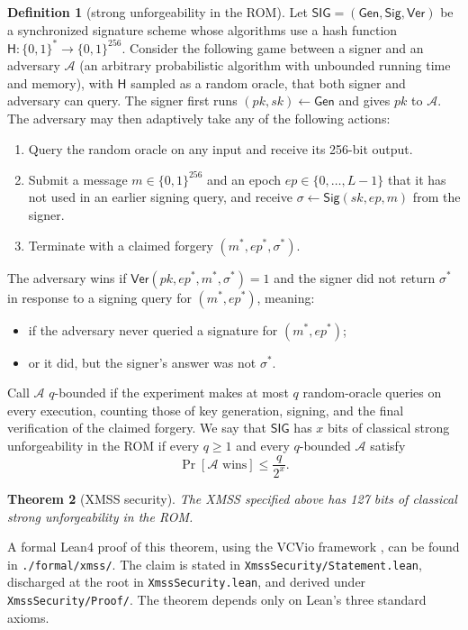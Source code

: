 \documentclass[11pt]{article}
\theoremstyle{definition}
\newtheorem{definition}{Definition}[section]
\theoremstyle{plain}
\newtheorem{theorem}[definition]{Theorem}
\theoremstyle{remark}
\newcommand{\bits}[1]{\{0,1\}^{#1}}
\newcommand{\Gen}{\mathsf{Gen}}
\newcommand{\Sig}{\mathsf{Sig}}
\newcommand{\Ver}{\mathsf{Ver}}
\newcommand{\SIG}{\mathsf{SIG}}
\newcommand{\hash}{\mathsf{H}}
\newcommand{\ep}{\mathit{ep}}
\newcommand{\sk}{\mathit{sk}}
\newcommand{\pk}{\mathit{pk}}
\begin{document}
\begin{definition}[strong unforgeability in the ROM]
Let $\SIG=(\Gen,\Sig,\Ver)$ be a synchronized signature scheme whose algorithms use a hash function $\hash:\bits{*}\to\bits{256}$. Consider the following game between a signer and an adversary $\mathcal A$ (an arbitrary probabilistic algorithm with unbounded running time and memory), with $\hash$ sampled as a random oracle, that both signer and adversary can query. The signer first runs $(\pk,\sk)\gets\Gen$ and gives $\pk$ to $\mathcal A$. The adversary may then adaptively take any of the following actions:
\begin{enumerate}[leftmargin=2em]
  \item Query the random oracle on any input and receive its 256-bit output.
  \item Submit a message $m\in\bits{256}$ and an epoch $\ep\in\{0,\ldots,L-1\}$ that it has not used in an earlier signing query, and receive $\sigma\gets\Sig(\sk,\ep,m)$ from the signer.
  \item Terminate with a claimed forgery $(m^*,\ep^*,\sigma^*)$.
\end{enumerate}
The adversary wins if $\Ver(\pk,\ep^*,m^*,\sigma^*)=1$ and the signer did not return $\sigma^*$ in response to a signing query for $(m^*,\ep^*)$, meaning:
\begin{itemize}[leftmargin=2em]
  \item if the adversary never queried a signature for $(m^*,\ep^*)$;
  \item or it did, but the signer's answer was not $\sigma^*$.
\end{itemize}

Call $\mathcal A$ $q$-bounded if the experiment makes at most $q$ random-oracle queries on every execution, counting those of key generation, signing, and the final verification of the claimed forgery. We say that $\SIG$ has $x$ bits of classical strong unforgeability in the ROM if every $q\geq1$ and every $q$-bounded $\mathcal A$ satisfy
\[
  \Pr[\mathcal A\text{ wins}]\leq\frac{q}{2^{x}}.
\]
\end{definition}

\begin{theorem}[XMSS security]
The XMSS specified above has 127 bits of classical strong unforgeability in the ROM.
\end{theorem}

A formal Lean4 proof of this theorem, using the VCVio framework \cite{VCVio}, can be found in \texttt{./formal/xmss/}. The claim is stated in \texttt{XmssSecurity/Statement.lean}, discharged at the root in \texttt{XmssSecurity.lean}, and derived under \texttt{XmssSecurity/Proof/}. The theorem depends only on Lean's three standard axioms.
\end{document}
